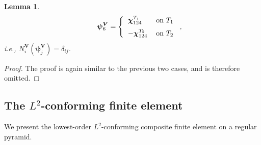 \documentclass[twoside,reqno,final]{amsart}
\newtheorem{lemma}{Lemma}
\renewcommand{\b}[1]{{\boldsymbol{#1}}}
\def\restrict#1{\raise-0.2ex\hbox{\ensuremath|}_{#1}}
\newcommand{\pol}{\mathbb{P}}
\begin{document}
\begin{lemma}
\begin{alignat*}{3}
\quad &&  
\b\psi^{\b V}_6 =
\left\{ \begin{tabular}{l l}
            $\b\chi_{124}^{T_1}$ & on $T_1$\vspace{0.2cm}\\
            $-\b\chi_{124}^{T_2}$ & on $T_2$
            \end{tabular}\right.,
\end{alignat*}
i.e., $N_i^{\b V}({\b\psi}^{\b V}_j) = \delta_{ij}$.
\end{lemma}
\begin{proof}
The proof is again similar to the previous two cases, and is therefore omitted.
%
%
%
\end{proof}


\subsection{The $L^2$-conforming finite element}
We present the lowest-order $L^2$-conforming composite finite element on 
a regular pyramid.
\end{document}
